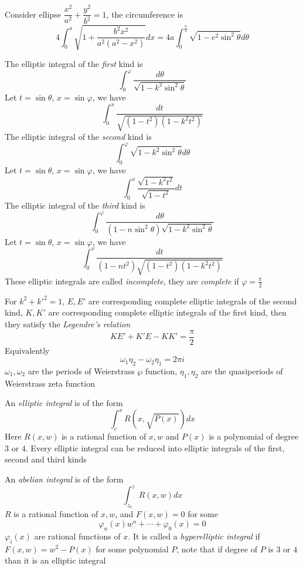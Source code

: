 \documentclass[main]{subfiles}
\begin{document}
Consider ellipse $\dfrac{x^2}{a^2}+\dfrac{y^2}{b^2}=1$, the circumference is
\[4\int_0^a\sqrt{1+\frac{b^2x^2}{a^2(a^2-x^2)}}dx=4a\int_0^{\frac{\pi}{2}}\sqrt{1-e^2\sin^2\theta}d\theta\]

\begin{definition}
The elliptic integral of the \textit{first} kind is
\[\int_0^\varphi\frac{d\theta}{\sqrt{1-k^2\sin^2\theta}}\]
Let $t=\sin\theta$, $x=\sin\varphi$, we have
\[\int_0^x\frac{dt}{\sqrt{(1-t^2)(1-k^2t^2)}}\]
The elliptic integral of the \textit{second} kind is
\[\int_0^\varphi \sqrt{1-k^2\sin^2\theta}d\theta\]
Let $t=\sin\theta$, $x=\sin\varphi$, we have
\[\int_0^x\frac{\sqrt{1-k^2t^2}}{\sqrt{1-t^2}}dt\]
The elliptic integral of the \textit{third} kind is
\[\int_0^\varphi\frac{d\theta}{(1-n\sin^2\theta)\sqrt{1-k^2\sin^2\theta}}\]
Let $t=\sin\theta$, $x=\sin\varphi$, we have
\[\int_0^x\frac{dt}{(1-nt^2)\sqrt{(1-t^2)(1-k^2t^2)}}\]
These elliptic integrals are called \textit{incomplete}, they are \textit{complete} if $\varphi=\frac{\pi}{2}$
\end{definition}

\begin{theorem}\label{Legendre's relation}
For $k^2+k'^2=1$, $E,E'$ are corresponding complete elliptic integrals of the second kind, $K,K'$ are corresponding complete elliptic integrals of the first kind, then they satisfy the \textit{Legendre's relation}
\[KE'+K'E-KK'=\frac{\pi}{2}\]
Equivalently
\[\omega_1\eta_2-\omega_2\eta_1=2\pi i\]
$\omega_1,\omega_2$ are the periods of Weierstrass $\wp$ function, $\eta_1,\eta_2$ are the quasiperiods of Weierstrass zeta function
\end{theorem}

\begin{definition}
An \textit{elliptic integral} is of the form
\[\int_c^xR\left(x,\sqrt{P(x)}\right)dx\]
Here $R(x,w)$ is a rational function of $x,w$ and $P(x)$ is a polynomial of degree $3$ or $4$. Every elliptic integral can be reduced into elliptic integrals of the first, second and third kinds
\end{definition}

\begin{definition}
An \textit{abelian integral} is of the form
\[\int_{z_0}^zR(x,w)dx\]
$R$ is a rational function of $x,w$, and $F(x,w)=0$ for some
\[\varphi_n(x)w^n+\cdots+\varphi_0(x)=0\]
$\varphi_i(x)$ are rational functions of $x$. It is called a \textit{hyperelliptic integral} if $F(x,w)=w^2-P(x)$ for some polynomial $P$, note that if degree of $P$ is $3$ or $4$ than it is an elliptic integral
\end{definition}
\end{document}
